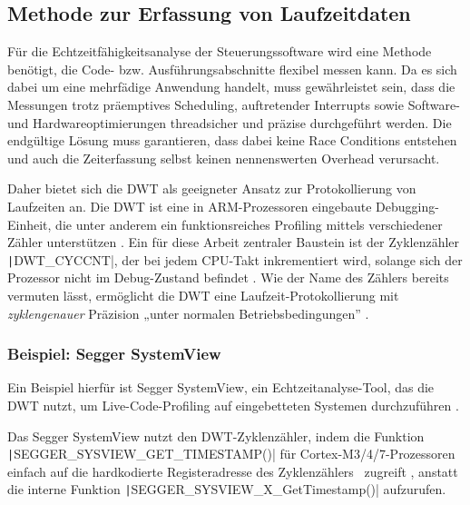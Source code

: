 \subsection{Methode zur Erfassung von Laufzeitdaten} \label{sec:dwt}

Für die Echtzeitfähigkeitsanalyse der Steuerungssoftware wird eine Methode
benötigt, die Code- bzw. Ausführungsabschnitte flexibel messen kann. Da es sich
dabei um eine mehrfädige Anwendung handelt, muss gewährleistet sein, dass die
Messungen trotz präemptives Scheduling, auftretender Interrupts sowie Software-
und Hardwareoptimierungen threadsicher und präzise durchgeführt werden. Die
endgültige Lösung muss garantieren, dass dabei keine Race Conditions entstehen
und auch die Zeiterfassung selbst keinen nennenswerten Overhead verursacht.

Daher bietet sich die \ac{DWT} als geeigneter Ansatz zur Protokollierung von
Laufzeiten an. Die DWT ist eine in ARM-Prozessoren eingebaute Debugging-Einheit,
die unter anderem ein funktionsreiches Profiling mittels verschiedener Zähler
unterstützen \cite{ARMv7_ref_man_dwt_profiling}. Ein für diese Arbeit zentraler
Baustein ist der Zyklenzähler \texttt|DWT_CYCCNT|, der bei jedem CPU-Takt
inkrementiert wird, solange sich der Prozessor nicht im Debug-Zustand befindet
\cite{ARMv7_ref_man_dwt_cycle}. Wie der Name des Zählers bereits vermuten lässt,
ermöglicht die DWT eine Laufzeit-Protokollierung mit \textit{zyklengenauer}
Präzision „unter normalen Betriebsbedingungen”
\cite{ARMv7_ref_man_dwt_profiling}.

\subsubsection{Beispiel: Segger SystemView}

Ein Beispiel hierfür ist Segger SystemView, ein Echtzeitanalyse-Tool, das die
DWT nutzt, um Live-Code-Profiling auf eingebetteten Systemen durchzuführen
\cite{SEGGER_SystemView}.

Das Segger SystemView nutzt den DWT-Zyklenzähler, indem die Funktion \linebreak
\texttt|SEGGER_SYSVIEW_GET_TIMESTAMP()| für Cortex-M3/4/7-Prozessoren
einfach auf die hardkodierte Registeradresse des
Zyklenzählers~\cite{Arm_DWT_Programmers_Model} zugreift \cite[S.
65]{Segger_SystemView_manual}, anstatt die interne Funktion
\texttt|SEGGER_SYSVIEW_X_GetTimestamp()| aufzurufen.
